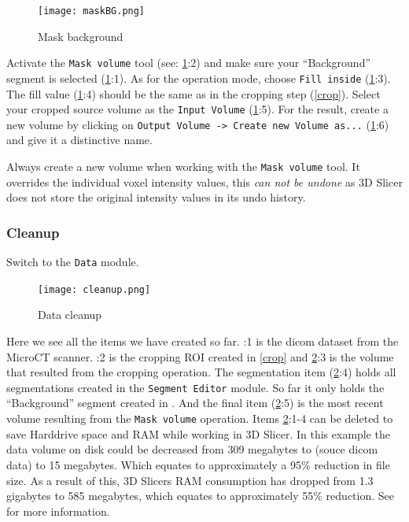 \pagebreak
\begin{figure}[h!]
	\centerline{
		\texttt{[image: maskBG.png]}}
	  \caption{Mask background}
	  \label{fig:mBG}
	\end{figure}
\noindent
Activate the \texttt{Mask volume} tool (see: \cref{fig:mBG}:2) and make sure your ``Background'' segment is selected (\cref{fig:mBG}:1).
As for the operation mode, choose \texttt{Fill inside} (\cref{fig:mBG}:3).
The fill value (\cref{fig:mBG}:4) should be the same as in the cropping step (\cref{crop}).
Select your cropped source volume as the \texttt{Input Volume} (\cref{fig:mBG}:5).
For the result, create a new volume by clicking on \texttt{Output Volume -> Create new Volume as...} (\cref{fig:mBG}:6) and give it a distinctive name.
\newline %
\newline
\begin{minipage}{0.4\textwidth}
  \begin{center}
	
\end{center}
\end{minipage}%
%
\begin{minipage}{0.5\textwidth}
  Always create a new volume when working with the \texttt{Mask volume} tool.
  It overrides the individual voxel intensity values, this \emph{can not be undone} as 3D Slicer does not store the original intensity values in its undo history.
\end{minipage}
\newline
\newline %
\pagebreak

\subsubsection{Cleanup}
Switch to the \texttt{Data} module.
\begin{figure}[h!]
	\centerline{
		\texttt{[image: cleanup.png]}}
	  \caption{Data cleanup}
	  \label{fig:clr}
	\end{figure}
\noindent
Here we see all the items we have created so far.
:1 is the dicom dataset from the MicroCT scanner.
:2 is the cropping ROI created in \cref{crop} and \cref{fig:clr}:3 is the volume that resulted from the cropping operation.
The segmentation item (\cref{fig:clr}:4) holds all segmentations created in the \texttt{Segment Editor} module. So far it only holds the ``Background'' segment created in . And the final item (\cref{fig:clr}:5) is the most recent volume resulting from the \texttt{Mask volume} operation.
Items \cref{fig:clr}:1-4 can be deleted to save Harddrive space and RAM while working in 3D Slicer.
\noindent
In this example the data volume on disk could be decreased from 309 megabytes to (souce dicom data) to 15 megabytes.
Which equates to approximately a 95\% reduction in file size.
As a result of this, 3D Slicers RAM consumption has dropped from 1.3 gigabytes to 585 megabytes, which equates to approximately 55\% reduction.
See  for more information.

